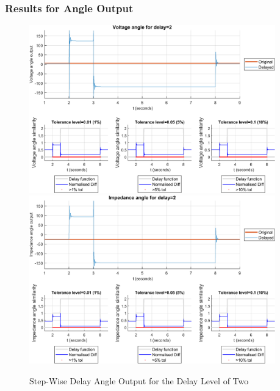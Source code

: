 \subsubsection{Results for Angle Output}


\begin{figure}
    \caption{Step-Wise Delay Angle Output for the Delay Level of Two}
    \includegraphics[width=0.95\textwidth]{PMUsim-figures/DelayOf_2/Step_vAngle.png}    
    \includegraphics[width=0.95\textwidth]{PMUsim-figures/DelayOf_2/Step_iAngle.png}    
    \label{fig:PMUsimStep_Two_Angle}
        \begin{small}
     \end{small}
\end{figure}


